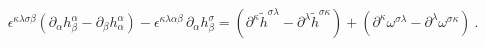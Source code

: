 \begin{equation}
\epsilon ^{\kappa \lambda \sigma \beta }\left( \partial _{\alpha }h_{\beta
}^{\alpha }-\partial _{\beta }h_{\alpha }^{\alpha }\right) -\epsilon
^{\kappa \lambda \alpha \beta }\,\partial _{\alpha }h_{\beta }^{\sigma
}=\left( \partial ^{\kappa }{\tilde{h}}^{\sigma \lambda }-\partial ^{\lambda
}{\tilde{h}}^{\sigma \kappa }\right) +\left( \partial ^{\kappa }\omega
^{\sigma \lambda }-\partial ^{\lambda }\omega ^{\sigma \kappa }\right) \ .
\label{DUALTR}
\end{equation}%
